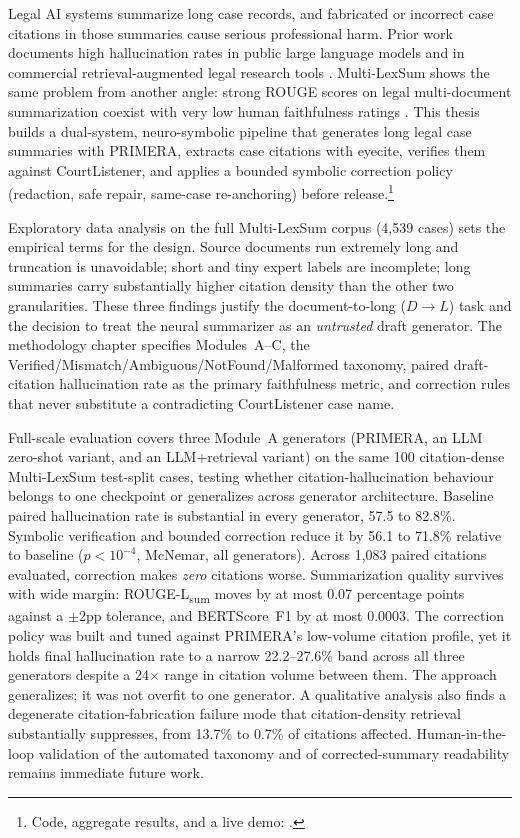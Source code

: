 Legal AI systems summarize long case records, and fabricated or incorrect case citations in those summaries cause serious professional harm. Prior work documents high hallucination rates in public large language models and in commercial retrieval-augmented legal research tools \cite{dahl2024largelegalfictions,magesh2025hallucinationfree}. Multi-LexSum shows the same problem from another angle: strong ROUGE scores on legal multi-document summarization coexist with very low human faithfulness ratings \cite{shen2022multilexsum,maynez2020faithfulness}. This thesis builds a dual-system, neuro-symbolic pipeline that generates long legal case summaries with PRIMERA, extracts case citations with eyecite, verifies them against CourtListener, and applies a bounded symbolic correction policy (redaction, safe repair, same-case re-anchoring) before release.\footnote{Code, aggregate results, and a live demo: \href{\repourl}{\repourl}.}

Exploratory data analysis on the full Multi-LexSum corpus (4{,}539 cases) sets the empirical terms for the design. Source documents run extremely long and truncation is unavoidable; short and tiny expert labels are incomplete; long summaries carry substantially higher citation density than the other two granularities. These three findings justify the document-to-long ($D\rightarrow L$) task and the decision to treat the neural summarizer as an \emph{untrusted} draft generator. The methodology chapter specifies Modules~A--C, the Verified/Mismatch/Ambiguous/NotFound/Malformed taxonomy, paired draft-citation hallucination rate as the primary faithfulness metric, and correction rules that never substitute a contradicting CourtListener case name.

Full-scale evaluation covers three Module~A generators (PRIMERA, an LLM zero-shot variant, and an LLM+retrieval variant) on the same 100 citation-dense Multi-LexSum test-split cases, testing whether citation-hallucination behaviour belongs to one checkpoint or generalizes across generator architecture. Baseline paired hallucination rate is substantial in every generator, 57.5 to 82.8\%. Symbolic verification and bounded correction reduce it by 56.1 to 71.8\% relative to baseline ($p<10^{-4}$, McNemar, all generators). Across 1{,}083 paired citations evaluated, correction makes \emph{zero} citations worse. Summarization quality survives with wide margin: ROUGE-L\textsubscript{sum} moves by at most 0.07 percentage points against a $\pm2$pp tolerance, and BERTScore~F1 by at most 0.0003. The correction policy was built and tuned against PRIMERA's low-volume citation profile, yet it holds final hallucination rate to a narrow 22.2--27.6\% band across all three generators despite a 24$\times$ range in citation volume between them. The approach generalizes; it was not overfit to one generator. A qualitative analysis also finds a degenerate citation-fabrication failure mode that citation-density retrieval substantially suppresses, from 13.7\% to 0.7\% of citations affected. Human-in-the-loop validation of the automated taxonomy and of corrected-summary readability remains immediate future work.
